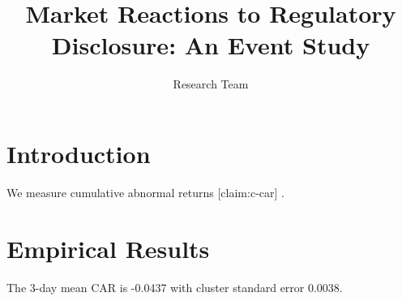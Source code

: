 \documentclass{article}
\newcommand{\result}[2]{#2}
\begin{document}
\title{Market Reactions to Regulatory Disclosure: An Event Study}
\author{Research Team}
\maketitle
\section{Introduction}
We measure cumulative abnormal returns [claim:c-car] \cite{fama1969}.
\section{Empirical Results}
The 3-day mean CAR is \result{primary.car_mean}{-0.0437}
with cluster standard error \result{primary.std_error}{0.0038}.
\par\medskip\noindent


\end{document}
